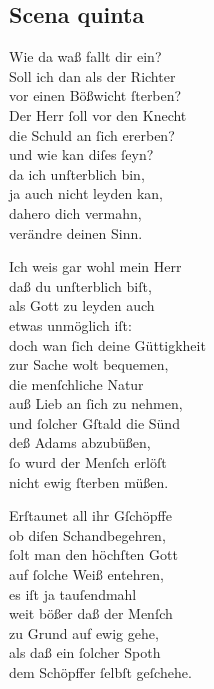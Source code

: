 \documentclass{ees}
\newenvironment{lyrics}[1]{%
  \subsection{#1}\nopagebreak%
  \begin{lyricslist}%
  \let\voice\item%
}{%
  \end{lyricslist}%
}
\begin{document}
\begin{lyrics}{Scena quinta}
  \voice[Schöpffer]
  Wie da waß fallt dir ein?\\
  Soll ich dan als der Richter\\
  vor einen Bößwicht ſterben?\\
  Der Herr ſoll vor den Knecht\\
  die Schuld an ſich ererben?\\
  und wie kan diſes ſeyn?\\
  da ich unſterblich bin,\\
  ja auch nicht leyden kan,\\
  dahero dich vermahn,\\
  verändre deinen Sinn.

  \voice[Barmh.]
  Ich weis gar wohl mein Herr\\
  daß du unſterblich biſt,\\
  als Gott zu leyden auch\\
  etwas unmöglich iſt:\\
  doch wan ſich deine Güttigkheit\\
  zur Sache wolt bequemen,\\
  die menſchliche Natur\\
  auß Lieb an ſich zu nehmen,\\
  und ſolcher Gſtald die Sünd\\
  deß Adams abzubüßen,\\
  ſo wurd der Menſch erlöſt\\
  nicht ewig ſterben müßen.

  \voice[Gerecht.]
  Erſtaunet all ihr Gſchöpffe\\
  ob diſen Schandbegehren,\\
  ſolt man den höchſten Gott\\
  auf ſolche Weiß entehren,\\
  es iſt ja tauſendmahl\\
  weit bößer daß der Menſch\\
  zu Grund auf ewig gehe,\\
  als daß ein ſolcher Spoth\\
  dem Schöpffer ſelbſt geſchehe.


\end{lyrics}
\end{document}
